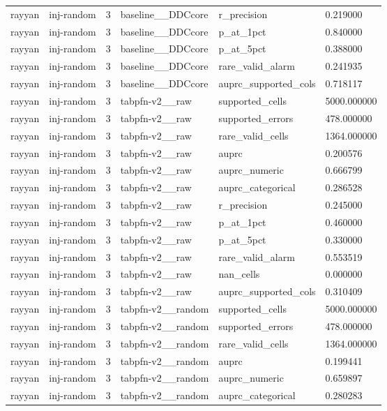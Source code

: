 \begin{tabular}{llllll}
rayyan & inj-random & 3 & baseline\_\_DDCcore & r\_precision & 0.219000 \\
rayyan & inj-random & 3 & baseline\_\_DDCcore & p\_at\_1pct & 0.840000 \\
rayyan & inj-random & 3 & baseline\_\_DDCcore & p\_at\_5pct & 0.388000 \\
rayyan & inj-random & 3 & baseline\_\_DDCcore & rare\_valid\_alarm & 0.241935 \\
rayyan & inj-random & 3 & baseline\_\_DDCcore & auprc\_supported\_cols & 0.718117 \\
rayyan & inj-random & 3 & tabpfn-v2\_\_raw & supported\_cells & 5000.000000 \\
rayyan & inj-random & 3 & tabpfn-v2\_\_raw & supported\_errors & 478.000000 \\
rayyan & inj-random & 3 & tabpfn-v2\_\_raw & rare\_valid\_cells & 1364.000000 \\
rayyan & inj-random & 3 & tabpfn-v2\_\_raw & auprc & 0.200576 \\
rayyan & inj-random & 3 & tabpfn-v2\_\_raw & auprc\_numeric & 0.666799 \\
rayyan & inj-random & 3 & tabpfn-v2\_\_raw & auprc\_categorical & 0.286528 \\
rayyan & inj-random & 3 & tabpfn-v2\_\_raw & r\_precision & 0.245000 \\
rayyan & inj-random & 3 & tabpfn-v2\_\_raw & p\_at\_1pct & 0.460000 \\
rayyan & inj-random & 3 & tabpfn-v2\_\_raw & p\_at\_5pct & 0.330000 \\
rayyan & inj-random & 3 & tabpfn-v2\_\_raw & rare\_valid\_alarm & 0.553519 \\
rayyan & inj-random & 3 & tabpfn-v2\_\_raw & nan\_cells & 0.000000 \\
rayyan & inj-random & 3 & tabpfn-v2\_\_raw & auprc\_supported\_cols & 0.310409 \\
rayyan & inj-random & 3 & tabpfn-v2\_\_random & supported\_cells & 5000.000000 \\
rayyan & inj-random & 3 & tabpfn-v2\_\_random & supported\_errors & 478.000000 \\
rayyan & inj-random & 3 & tabpfn-v2\_\_random & rare\_valid\_cells & 1364.000000 \\
rayyan & inj-random & 3 & tabpfn-v2\_\_random & auprc & 0.199441 \\
rayyan & inj-random & 3 & tabpfn-v2\_\_random & auprc\_numeric & 0.659897 \\
rayyan & inj-random & 3 & tabpfn-v2\_\_random & auprc\_categorical & 0.280283 \\

\end{tabular}
